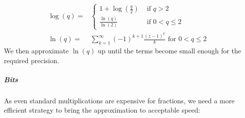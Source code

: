 \documentclass{book}
\begin{document}
                    \begin{align*}
                        \log(q) ={}& \begin{cases}
                            1 + \log(\frac{q}{2}) & \text{ if } q > 2\\ 
                            \frac{\ln(q)}{\ln(2)} & \text{ if } 0 < q \leq 2
                        \end{cases}\\
                        \ln(q) ={}& \sum_{k=1}^{\infty} (-1)^{k+1} \frac{(z-1)^k}{k} \text{ for } 0 < q \leq 2
                    \end{align*}
                    We then approximate $\ln(q)$ up until the terms become small enough for the required precision.

                \subparagraph{Bits}
                    As even standard multiplications are expensive for fractions, we need a more efficient strategy to bring the approximation to acceptable speed:
\end{document}
